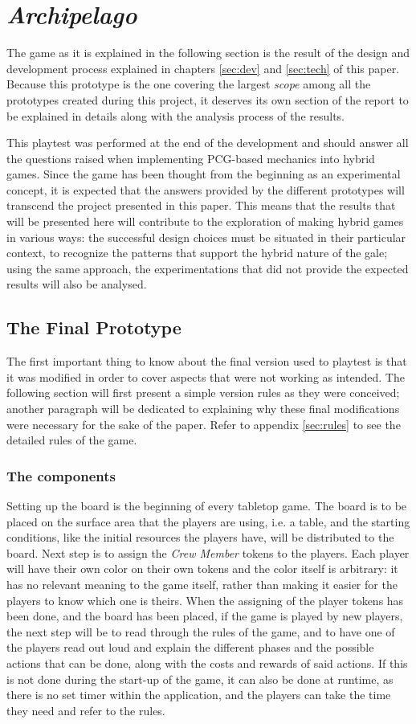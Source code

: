 \chapter{\textit{Archipelago}}
The game as it is explained in the following section is the result of the design and development process explained in chapters \ref{sec:dev} and \ref{sec:tech} of this paper. Because this prototype is the one covering the largest \textit{scope} among all the prototypes created during this project, it deserves its own section of the report to be explained in details along with the analysis process of the results.
 
This playtest was performed at the end of the development and should answer all the questions raised when implementing PCG-based mechanics into hybrid games. Since the game has been thought from the beginning as an experimental concept, it is expected that the answers provided by the different prototypes will transcend the project presented in this paper. This means that the results that will be presented here will contribute to the exploration of making hybrid games in various ways: the successful design choices must be situated in their particular context, to recognize the patterns that support the hybrid nature of the gale; using the same approach, the experimentations that did not provide the expected results will also be analysed.
\section{The Final Prototype}
\label{sec:finalproto}
The first important thing to know about the final version used to playtest is that it was modified in order to cover aspects that were not working as intended. The following section will first present a simple version rules as they were conceived; another paragraph will be dedicated to explaining why these final modifications were necessary for the sake of the paper. Refer to appendix \ref{sec:rules} to see the detailed rules of the game.

\subsection{The components}
Setting up the board is the beginning of every tabletop game. The board is to be placed on the surface area that the players are using, i.e. a table, and the starting conditions, like the initial resources the players have, will be distributed to the board. Next step is to assign the \textit{Crew Member} tokens to the players. Each player will have their own color on their own tokens and the color itself is arbitrary: it has no relevant meaning to the game itself, rather than making it easier for the players to know which one is theirs.
When the assigning of the player tokens has been done, and the board has been placed, if the game is played by new players, the next step will be to read through the rules of the game, and to have one of the players read out loud and explain the different phases and the possible actions that can be done, along with the costs and rewards of said actions. If this is not done during the start-up of the game, it can also be done at runtime, as there is no set timer within the application, and the players can take the time they need and refer to the rules.
